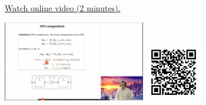
\begin{minipage}{10cm}
    \href{https://act4e-spring21.netlify.app/videos/spring2021-profunctors:dpi-comp.html}{Watch online video (2 minutes).}
        
    \href{https://act4e-spring21.netlify.app/videos/spring2021-profunctors:dpi-comp.html}{\includegraphics[height=3.5cm]{spring2021-profunctors:dpi-comp/thumbnails.jpg}}
    \href{https://act4e-spring21.netlify.app/videos/spring2021-profunctors:dpi-comp.html}{\includegraphics[height=2.5cm]{spring2021-profunctors:dpi-comp/qrcode.png}}
\end{minipage}
